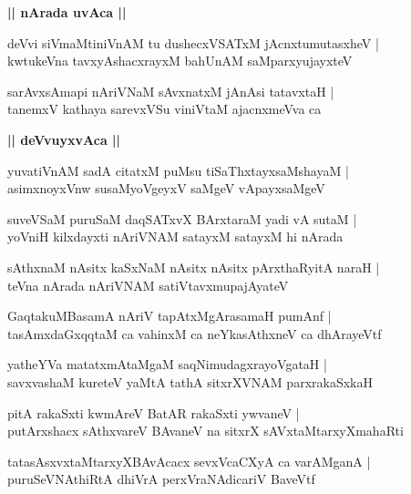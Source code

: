 \documentclass[twoside,12pt,openright]{book}
\newcounter{shloka}[chapter]
\def\uvaca#1{\centerline{{\large\textbf{#1}}}}
\begin{document}
\uvaca{|| nArada uvAca ||}

\begin{shloka}%
deVvi siVmaMtiniVnAM tu dushecxVSATxM jAcnxtumutasxheV |\\
kwtukeVna tavxyAshacxrayxM bahUnAM saMparxyujayxteV
\end{shloka}

\begin{shloka}%
sarAvxsAmapi nAriVNaM sAvxnatxM jAnAsi tatavxtaH |\\
tanemxV kathaya sarevxVSu viniVtaM ajacnxmeVva ca 
\end{shloka}

\uvaca{|| deVvuyxvAca ||}

\begin{shloka}%
yuvatiVnAM sadA citatxM puMsu tiSaThxtayxsaMshayaM |\\
asimxnoyxVnw susaMyoVgeyxV saMgeV vApayxsaMgeV
\end{shloka}

\begin{shloka}%
suveVSaM puruSaM daqSATxvX BArxtaraM yadi vA sutaM |\\
yoVniH kilxdayxti nAriVNAM satayxM satayxM hi nArada
\end{shloka}

\begin{shloka}%
sAthxnaM nAsitx kaSxNaM nAsitx nAsitx pArxthaRyitA naraH |\\
teVna nArada nAriVNAM satiVtavxmupajAyateV 
\end{shloka}

\begin{shloka}%
GaqtakuMBasamA nAriV tapAtxMgArasamaH pumAnf |\\
tasAmxdaGxqqtaM ca vahinxM ca neYkasAthxneV ca dhArayeVtf
\end{shloka}

\begin{shloka}%
yatheYVa matatxmAtaMgaM saqNimudagxrayoVgataH |\\
savxvashaM kureteV yaMtA tathA sitxrXVNAM parxrakaSxkaH 
\end{shloka}

\begin{shloka}%
pitA rakaSxti kwmAreV BatAR rakaSxti ywvaneV |\\
putArxshacx sAthxvareV BAvaneV na sitxrX sAVxtaMtarxyXmahaRti
\end{shloka}

\begin{shloka}%
tatasAsxvxtaMtarxyXBAvAcacx sevxVcaCXyA ca varAMganA |\\
puruSeVNAthiRtA dhiVrA perxVraNAdicariV BaveVtf
\end{shloka}
\end{document}
